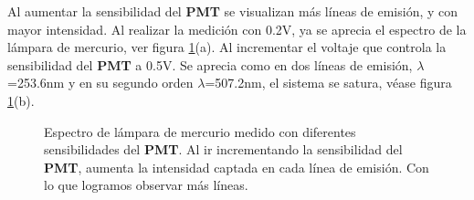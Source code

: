 Al aumentar la sensibilidad del \textbf{PMT} se visualizan más líneas de emisión, y con mayor intensidad. Al realizar la medición con 0.2V, ya se aprecia el espectro de la lámpara de mercurio, ver figura \ref{fig:hglamp}(a). Al incrementar el voltaje que controla la sensibilidad del \textbf{PMT} a 0.5V. Se aprecia como en dos líneas de emisión, $\lambda$=253.6nm y en su segundo orden $\lambda$=507.2nm, el sistema se satura, véase figura \ref{fig:hglamp}(b).
\begin{figure}[h!]
	\caption[Espectro de lámpara de mercurio medido con diferentes sensibilidades del \textbf{PMT}]{Espectro de lámpara de mercurio medido con diferentes sensibilidades del \textbf{PMT}. Al ir incrementando la sensibilidad del \textbf{PMT}, aumenta la intensidad captada en cada línea de emisión. Con lo que logramos observar más líneas.}
	\label{fig:hglamp}
\end{figure}
\newpage


